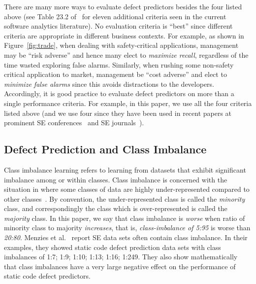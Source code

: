 \documentclass[10pt,conference]{IEEEtran}
\theoremstyle{break}
\theoremstyle{break}
\begin{document}
There are many more ways to evaluate defect predictors besides the four listed above
(see Table 23.2 of~\cite{menzies2014sharing} for   eleven additional
criteria seen in the current software analytics literature).
No evaluation criteria is ``best'' since different  criteria are appropriate in different business contexts. For example, as shown
in 
Figure~\ref{fig:trade},
when dealing
with safety-critical applications, management may be
``risk adverse'' and hence many elect
 to {\em maximize recall}, regardless of the time wasted exploring  false alarms.
 Similarly, 
when rushing some non-safety critical application to market, management  be ``cost adverse''
and elect to {\em minimize false alarms} since this avoids distractions to the developers. 
 Accordingly, it is good practice to evaluate defect predictors on more than a single performance criteria. For example, in this paper,
we use all the four   criteria listed above
(and we use four since they have
been used in recent papers  
at prominent SE conferences~\cite{ghotra2015revisiting} and SE journals~\cite{fu2016tuning}).
 

\subsection{Defect Prediction and Class Imbalance}
\label{sect:motivation}

Class imbalance learning refers to learning from datasets that exhibit significant imbalance among or within classes. Class imbalance  is concerned with the situation in where some classes of data are
highly under-represented compared to other classes~\cite{he2009learning}.
By convention,
the under-represented class is called the {\em minority} class,
and correspondingly the class which is over-represented is called the
{\em majority} class. In this paper, we say that class imbalance is {\em worse}
when ratio of minority class to majority {\em increases}, that is,
{\em class-imbalance of 5:95} is worse than {\em 20:80}. Menzies et al.~\cite{menzies2007problems} report SE data sets often contain class imbalance. In their examples, they showed static code defect prediction data sets with
class imbalances of 1:7; 1:9; 1:10; 1:13; 1:16; 1:249.
They also show mathematically that  class imbalances  have a very large  negative effect on the performance of static code defect predictors.  
\end{document}
